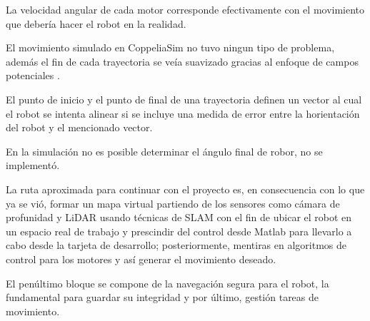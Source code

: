\documentclass[conference]{IEEEtran}
\begin{document}
La velocidad angular de cada motor corresponde efectivamente con el movimiento que debería
hacer el robot en la realidad.

El movimiento simulado en CoppeliaSim no tuvo ningun tipo de problema, además el fin de cada
trayectoria se veía suavizado gracias al enfoque de campos potenciales \cite{gonzalez-villela_cinematica_2015}.

El punto de inicio y el punto de final de una trayectoria definen un vector al cual el robot
se intenta alinear si se incluye una medida de error entre la horientación del robot y el mencionado vector.

En la simulación no es posible determinar el ángulo final de robor, no se implementó.

La ruta aproximada para continuar con el proyecto es, en consecuencia con lo que ya se vió,
formar un mapa virtual partiendo de los sensores como cámara de profunidad y LiDAR usando
técnicas de SLAM con el fin de ubicar el robot en un espacio real de trabajo y prescindir
del control desde Matlab para llevarlo a cabo desde la tarjeta de desarrollo; posteriormente,
mentiras en algoritmos de control para los motores y así generar el movimiento deseado.

El penúltimo bloque se compone de la navegación segura para el robot, la fundamental para
guardar su integridad y por último, gestión tareas de movimiento.
\end{document}
